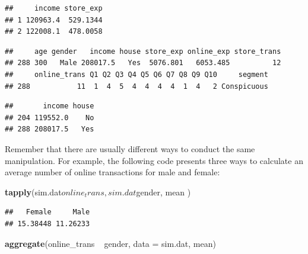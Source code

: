 \documentclass[]{book}
\newenvironment{Shaded}{\begin{snugshade}}{\end{snugshade}}
\newcommand{\KeywordTok}[1]{\textcolor[rgb]{0.13,0.29,0.53}{\textbf{{#1}}}}
\newcommand{\DataTypeTok}[1]{\textcolor[rgb]{0.13,0.29,0.53}{{#1}}}
\newcommand{\DecValTok}[1]{\textcolor[rgb]{0.00,0.00,0.81}{{#1}}}
\newcommand{\StringTok}[1]{\textcolor[rgb]{0.31,0.60,0.02}{{#1}}}
\newcommand{\CommentTok}[1]{\textcolor[rgb]{0.56,0.35,0.01}{\textit{{#1}}}}
\newcommand{\NormalTok}[1]{{#1}}
\theoremstyle{definition}
\theoremstyle{definition}
\theoremstyle{remark}
\begin{document}
\begin{verbatim}
##     income store_exp
## 1 120963.4  529.1344
## 2 122008.1  478.0058
\end{verbatim}

\begin{Shaded}
\end{Shaded}

\begin{verbatim}
##     age gender   income house store_exp online_exp store_trans
## 288 300   Male 208017.5   Yes  5076.801   6053.485          12
##     online_trans Q1 Q2 Q3 Q4 Q5 Q6 Q7 Q8 Q9 Q10     segment
## 288           11  1  4  5  4  4  4  4  1  4   2 Conspicuous
\end{verbatim}

\begin{Shaded}
\end{Shaded}

\begin{verbatim}
##       income house
## 204 119552.0    No
## 288 208017.5   Yes
\end{verbatim}

Remember that there are usually different ways to conduct the same
manipulation. For example, the following code presents three ways to
calculate an average number of online transactions for male and female:

\begin{Shaded}
\begin{Highlighting}[]
\KeywordTok{tapply}\NormalTok{(sim.dat$online_trans, sim.dat$gender, mean )}
\end{Highlighting}
\end{Shaded}

\begin{verbatim}
##   Female     Male 
## 15.38448 11.26233
\end{verbatim}

\begin{Shaded}
\begin{Highlighting}[]
\KeywordTok{aggregate}\NormalTok{(online_trans ~}\StringTok{ }\NormalTok{gender, }\DataTypeTok{data =} \NormalTok{sim.dat, mean)}
\end{Highlighting}
\end{Shaded}
\end{document}
